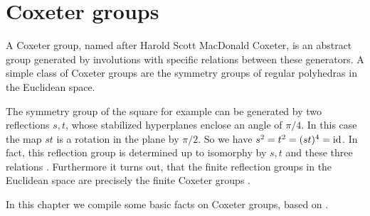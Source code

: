 \section{Coxeter groups}
\label{sec:coxeter-groups}

A Coxeter group, named after Harold Scott MacDonald Coxeter, is an abstract group generated by involutions with specific relations between these generators. A simple class of Coxeter groups are the symmetry groups of regular polyhedras in the Euclidean space.

The symmetry group of the square for example can be generated by two reflections $s,t$, whose stabilized hyperplanes enclose an angle of $\pi / 4$. In this case the map $st$ is a rotation in the plane by $\pi / 2$. So we have $s^2 = t^2 = (st)^4 = \operatorname{id}$. In fact, this reflection group is determined up to isomorphy by $s,t$ and these three relations \cite[Theorem 1.9]{humphreys:coxeter}. Furthermore it turns out, that the finite reflection groups in the Euclidean space are precisely the finite Coxeter groups \cite[Theorem 6.4]{humphreys:coxeter}.

In this chapter we compile some basic facts on Coxeter groups, based on \cite{humphreys:coxeter}.





